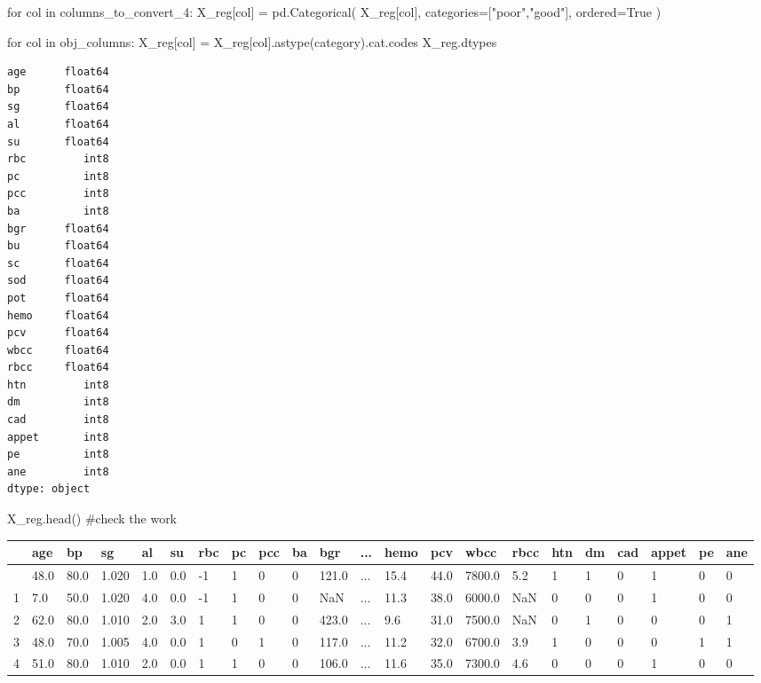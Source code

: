 \documentclass[
  11pt,
  letterpaper,
  DIV=11,
  numbers=noendperiod]{scrartcl}
\newenvironment{Shaded}{\begin{snugshade}}{\end{snugshade}}
\newcommand{\CommentTok}[1]{\textcolor[rgb]{0.37,0.37,0.37}{#1}}
\newcommand{\ControlFlowTok}[1]{\textcolor[rgb]{0.00,0.23,0.31}{#1}}
\newcommand{\KeywordTok}[1]{\textcolor[rgb]{0.00,0.23,0.31}{#1}}
\newcommand{\NormalTok}[1]{\textcolor[rgb]{0.00,0.23,0.31}{#1}}
\newcommand{\OperatorTok}[1]{\textcolor[rgb]{0.37,0.37,0.37}{#1}}
\newcommand{\StringTok}[1]{\textcolor[rgb]{0.13,0.47,0.30}{#1}}
\newcommand{\VariableTok}[1]{\textcolor[rgb]{0.07,0.07,0.07}{#1}}
\begin{document}
\begin{Shaded}
\begin{Highlighting}[]
\ControlFlowTok{for}\NormalTok{ col }\KeywordTok{in}\NormalTok{ columns\_to\_convert\_4:}
\NormalTok{    X\_reg[col] }\OperatorTok{=}\NormalTok{ pd.Categorical(}
\NormalTok{        X\_reg[col], }
\NormalTok{        categories}\OperatorTok{=}\NormalTok{[}\StringTok{"poor"}\NormalTok{,}\StringTok{"good"}\NormalTok{], }
\NormalTok{        ordered}\OperatorTok{=}\VariableTok{True}
\NormalTok{    )}


\ControlFlowTok{for}\NormalTok{ col }\KeywordTok{in}\NormalTok{ obj\_columns:}
\NormalTok{    X\_reg[col] }\OperatorTok{=}\NormalTok{ X\_reg[col].astype(}\StringTok{\textquotesingle{}category\textquotesingle{}}\NormalTok{).cat.codes}
\NormalTok{X\_reg.dtypes}
\end{Highlighting}
\end{Shaded}

\begin{verbatim}
age      float64
bp       float64
sg       float64
al       float64
su       float64
rbc         int8
pc          int8
pcc         int8
ba          int8
bgr      float64
bu       float64
sc       float64
sod      float64
pot      float64
hemo     float64
pcv      float64
wbcc     float64
rbcc     float64
htn         int8
dm          int8
cad         int8
appet       int8
pe          int8
ane         int8
dtype: object
\end{verbatim}

\begin{Shaded}
\begin{Highlighting}[]
\NormalTok{X\_reg.head() }\CommentTok{\#check the work}
\end{Highlighting}
\end{Shaded}

\begin{longtable}[]{@{}llllllllllllllllllllll@{}}
\toprule\noalign{}
& age & bp & sg & al & su & rbc & pc & pcc & ba & bgr & ... & hemo & pcv
& wbcc & rbcc & htn & dm & cad & appet & pe & ane \\
\midrule\noalign{}
\endhead
\bottomrule\noalign{}
\endlastfoot
0 & 48.0 & 80.0 & 1.020 & 1.0 & 0.0 & -1 & 1 & 0 & 0 & 121.0 & ... &
15.4 & 44.0 & 7800.0 & 5.2 & 1 & 1 & 0 & 1 & 0 & 0 \\
1 & 7.0 & 50.0 & 1.020 & 4.0 & 0.0 & -1 & 1 & 0 & 0 & NaN & ... & 11.3 &
38.0 & 6000.0 & NaN & 0 & 0 & 0 & 1 & 0 & 0 \\
2 & 62.0 & 80.0 & 1.010 & 2.0 & 3.0 & 1 & 1 & 0 & 0 & 423.0 & ... & 9.6
& 31.0 & 7500.0 & NaN & 0 & 1 & 0 & 0 & 0 & 1 \\
3 & 48.0 & 70.0 & 1.005 & 4.0 & 0.0 & 1 & 0 & 1 & 0 & 117.0 & ... & 11.2
& 32.0 & 6700.0 & 3.9 & 1 & 0 & 0 & 0 & 1 & 1 \\
4 & 51.0 & 80.0 & 1.010 & 2.0 & 0.0 & 1 & 1 & 0 & 0 & 106.0 & ... & 11.6
& 35.0 & 7300.0 & 4.6 & 0 & 0 & 0 & 1 & 0 & 0 \\
\end{longtable}
\end{document}
